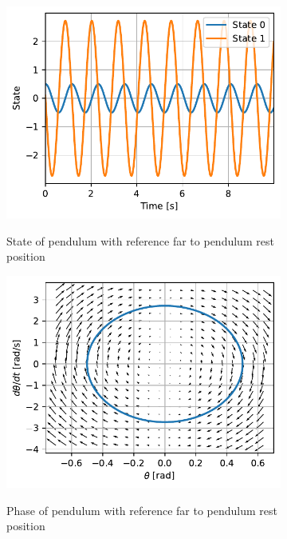 \documentclass{cmc}
\begin{document}
\begin{figure}[H]
  \centering
  \begin{subfigure}[b]{0.49\textwidth}
    { \centering
      \includegraphics[width=\textwidth]{figures/State_Spring_Reference_2(x0_=_[0dot5,_0dot1]).pdf}
    }
    \label{fig:state-pendulum-spring-reference-2}
    \caption{State of pendulum with reference far to pendulum rest
      position}
  \end{subfigure}
  \begin{subfigure}[b]{0.49\textwidth}
    { \centering
      \includegraphics[width=\textwidth]{figures/Phase_Spring_Reference_2(x0_=_[0dot5,_0dot1]).pdf}
    }
    \label{fig:phase-pendulum-spring-reference-2}
    \caption{Phase of pendulum with reference far to pendulum rest
      position}
  \end{subfigure}
  \caption{}
  \label{fig:pendulum-spring-reference-2}
\end{figure}
\end{document}
